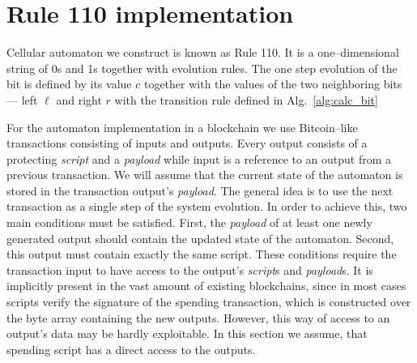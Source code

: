 \documentclass[runningheads]{llncs}
\newcommand{\payload}{\textit{payload}}
\newcommand{\script}{\textit{script}}
\begin{document}
    \section{Rule 110 implementation}
    \label{section2}
    Cellular automaton we construct is known as Rule 110.
    It is a one--dimensional string of 0s and 1s together with evolution rules.
    The one step evolution of the bit is defined by its value $c$ together with the
    values of the two neighboring bits --- left $\ell$ and right $r$ with the
    transition rule defined in Alg.~\ref{alg:calc_bit}
    

    For the automaton implementation in a blockchain we use
    Bitcoin--like transactions consisting of inputs and outputs. Every output
    consists of a protecting \script{} and a \payload{} while input is a
    reference to an output from a previous transaction.  We will assume that the
    current state of the automaton is stored in the transaction output's
    \payload{}.  The general idea is to use the next transaction as a single
    step of the system evolution. In order to achieve this, two main conditions
    must be satisfied. First, the \payload{} of at least one newly generated
    output should contain the updated state of the automaton. Second, this
    output must contain exactly the same script. These conditions require the
    transaction input to have access to the output's \script{}s and \payload{}s.
    It is implicitly present in the vast amount of existing blockchains, since
    in most cases scripts verify the signature of the spending transaction,
    which is constructed over the byte array containing the new outputs.
    However, this way of access to an output's data may be hardly exploitable.
    In this section we assume, that spending script has a direct access to the
    outputs.
\end{document}
